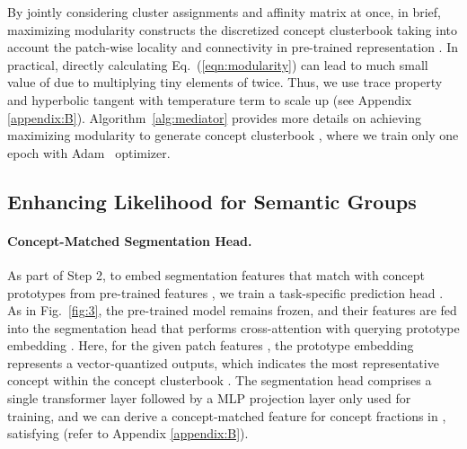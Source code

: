 \documentclass{article} \usepackage{iclr2024_conference,times}
\begin{document}
By jointly considering cluster assignments  and affinity matrix  at once, in brief, maximizing modularity  constructs the discretized concept clusterbook  taking into account the patch-wise locality and connectivity in pre-trained representation . In practical, directly calculating Eq.~(\ref{eqn:modularity}) can lead to much small value of  due to multiplying tiny elements of  twice. Thus, we use trace property and hyperbolic tangent with temperature term  to scale up  (see Appendix \ref{appendix:B}). Algorithm~\ref{alg:mediator} provides more details on achieving maximizing modularity to generate concept clusterbook , where we train only one epoch with Adam~\citep{kingma2014adam} optimizer.

\subsection{Enhancing Likelihood for Semantic Groups}
\label{sec:3.3}

\paragraph{Concept-Matched Segmentation Head.} As part of Step 2, to embed segmentation features  that match with concept prototypes from pre-trained features , we train a task-specific prediction head . As in Fig.~\ref{fig:3}, the pre-trained model remains frozen, and their features  are fed into the segmentation head  that performs cross-attention with querying prototype embedding . Here, for the given patch features , the prototype embedding  represents a vector-quantized outputs, which indicates the most representative concept  within the concept clusterbook . The segmentation head  comprises a single transformer layer followed by a MLP projection layer only used for training, and we can derive a concept-matched feature  for concept fractions in , satisfying  (refer to Appendix \ref{appendix:B}).
\end{document}
